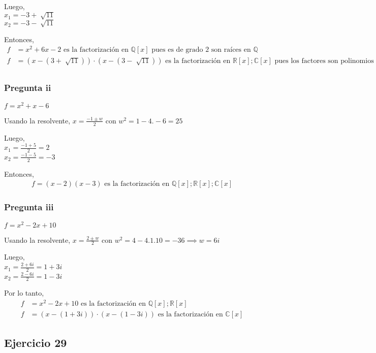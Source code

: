 Luego, \\
$ x_1 = -3 + \sqrt[]{11} $ \\
$ x_2 = -3 - \sqrt[]{11} $ 

Entonces,
\begin{align*}
    f &= x^2 + 6x - 2 \text{ es la factorización en } \mathbb{Q}[x] \text{ pues es de grado 2 son raíces en } \mathbb{Q} \\
    f &= (x-(3+\sqrt[]{11})) \cdot (x-(3-\sqrt[]{11})) \text{ es la factorización en } \mathbb{R}[x]; \mathbb{C}[x] \text{ pues los factores son polinomios irred de gr 1} \\
\end{align*}
\subsubsection{Pregunta ii}
$ f = x^2 + x - 6 $

Usando la resolvente, $ x = \frac{-1 \pm w}{2} $ con $ w^2 = 1-4.-6 = 25 $

Luego, \\
$ x_1 = \frac{-1+5}{2} = 2 $ \\
$ x_2 = \frac{-1-5}{2} = -3 $ 

Entonces,
\begin{align*}
    f = (x-2)(x-3) \text{ es la factorización en } \mathbb{Q}[x]; \mathbb{R}[x]; \mathbb{C}[x]
\end{align*}

\subsubsection{Pregunta iii}
$ f = x^2 - 2x + 10 $

Usando la resolvente, $ x = \frac{2 \pm w}{2} $ con $ w^2 = 4-4.1.10 = -36 \implies w = 6i$

Luego, \\
$ x_1 = \frac{2+6i}{2} = 1+3i $ \\
$ x_2 = \frac{2-6i}{2} = 1-3i $ 

Por lo tanto,
\begin{align*}
    f &= x^2 - 2x + 10 \text{ es la factorización en } \mathbb{Q}[x]; \mathbb{R}[x] \\
    f &= (x-(1+3i))\cdot (x-(1-3i)) \text{ es la factorización en } \mathbb{C}[x]
\end{align*}

\subsection{Ejercicio 29}
